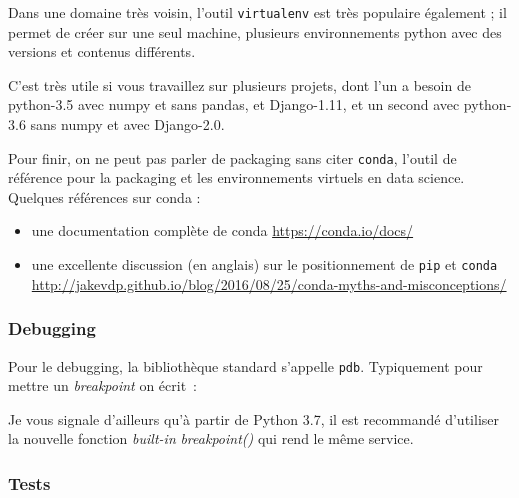     Dans une domaine très voisin, l'outil \texttt{virtualenv} est très
populaire également ; il permet de créer sur une seul machine, plusieurs
environnements python avec des versions et contenus différents.

C'est très utile si vous travaillez sur plusieurs projets, dont l'un a
besoin de python-3.5 avec numpy et sans pandas, et Django-1.11, et un
second avec python-3.6 sans numpy et avec Django-2.0.

    Pour finir, on ne peut pas parler de packaging sans citer
\texttt{conda}, l'outil de référence pour la packaging et les
environnements virtuels en data science. Quelques références sur conda :

\begin{itemize}
\tightlist
\item
  une documentation complète de conda \url{https://conda.io/docs/}
\item
  une excellente discussion (en anglais) sur le positionnement de
  \texttt{pip} et \texttt{conda}
  \url{http://jakevdp.github.io/blog/2016/08/25/conda-myths-and-misconceptions/}
\end{itemize}

    \hypertarget{debugging}{%
\subsubsection{Debugging}\label{debugging}}

    Pour le debugging, la bibliothèque standard s'appelle \texttt{pdb}.
Typiquement pour mettre un \emph{breakpoint} on écrit~:

\begin{Shaded}
\begin{Highlighting}[frame=lines,framerule=0.6mm,rulecolor=\color{asisframecolor}]
\OperatorTok{=}\OperatorTok{**} 
    \OperatorTok{/} 
\end{Highlighting}
\end{Shaded}

    Je vous signale d'ailleurs qu'à partir de Python 3.7, il est recommandé
d'utiliser la nouvelle fonction \emph{built-in} \emph{breakpoint()} qui
rend le même service.

    \hypertarget{tests}{%
\subsubsection{Tests}\label{tests}}

